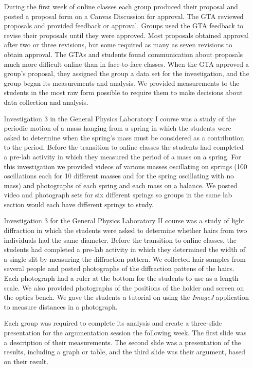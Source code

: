 \documentclass[aip, numerical, preprint]{revtex4-2}
\begin{document}
During the first week of online classes each group produced their proposal and posted a
proposal form on a Canvas Discussion for approval. The GTA reviewed proposals and provided
feedback or approval. Groups used the GTA feedback to revise their proposals until they were
approved. Most proposals obtained approval after two or three revisions, but some required as
many as seven revisions to obtain approval. The GTAs and students found communication about
proposals much more difficult online than in face-to-face classes. When the GTA approved a
group's proposal, they assigned the group a data set for the investigation, and the group began
its measurements and analysis. We provided measurements to the students in the most raw form
possible to require them to make decisions about data collection and analysis.

Investigation 3 in the General Physics Laboratory I course was a study of the periodic motion
of a mass hanging from a spring in which the students were asked to determine when the spring's
mass must be considered as a contribution to the period. Before the transition to online
classes the students had completed a pre-lab activity in which they measured the period of a
mass on a spring. For this investigation we provided videos of various masses oscillating on
springs (100 oscillations each for 10 different masses and for the spring oscillating with no
mass) and photographs of each spring and each mass on a balance. We posted video and photograph
sets for six different springs so groups in the same lab section would each have different
springs to study.

Investigation 3 for the General Physics Laboratory II course was a study of light diffraction
in which the students were asked to determine whether hairs from two individuals had the same
diameter. Before the transition to online classes, the students had completed a pre-lab
activity in which they determined the width of a single slit by measuring the diffraction
pattern. We collected hair samples from several people and posted photographs of the
diffraction pattens of the hairs. Each photograph had a ruler at the bottom for the students to
use as a length scale. We also provided photographs of the positions of the holder and screen
on the optics bench. We gave the students a tutorial on using the \emph{ImageJ}
application\citep{schrasetal12} to measure distances in a photograph.

Each group was required to complete its analysis and create a three-slide presentation for the
argumentation session the following week. The first slide was a description of their
measurements. The second slide was a presentation of the results, including a graph or table,
and the third slide was their argument, based on their result.
\end{document}
